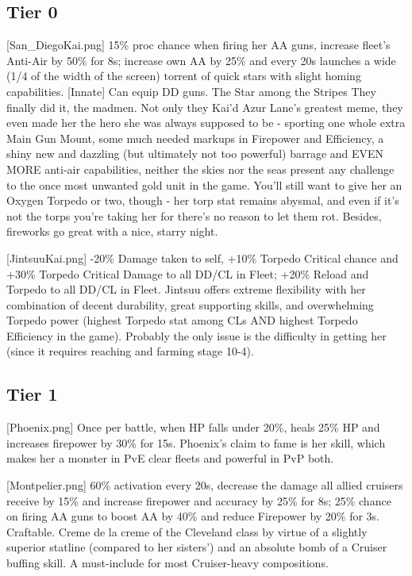 \subsection{Tier 0}
[San_DiegoKai.png]
{15\% proc chance when firing her AA guns, increase fleet's Anti-Air by 50\% for 8s; increase own AA by 25\% and every 20s launches a wide (1/4 of the width of the screen) torrent of quick stars with slight homing capabilities. [Innate] Can equip DD guns.}
{The Star among the Stripes}
{They finally did it, the madmen. Not only they Kai'd Azur Lane's greatest meme, they even made her the hero she was always supposed to be - sporting one whole extra Main Gun Mount, some much needed markups in Firepower and Efficiency, a shiny new and dazzling (but ultimately not too powerful) barrage and EVEN MORE anti-air capabilities, neither the skies nor the seas present any challenge to the once most unwanted gold unit in the game.
You'll still want to give her an Oxygen Torpedo or two, though - her torp stat remains abysmal, and even if it's not the torps you're taking her for there's no reason to let them rot. Besides, fireworks go great with a nice, starry night.}

[JintsuuKai.png]
{-20\% Damage taken to self, +10\% Torpedo Critical chance and +30\% Torpedo Critical Damage to all DD/CL in Fleet; +20\% Reload and Torpedo to all DD/CL in Fleet.}
{}
{Jintsuu offers extreme flexibility with her combination of decent durability, great supporting skills, and overwhelming Torpedo power (highest Torpedo stat among CLs AND highest Torpedo Efficiency in the game). Probably the only issue is the difficulty in getting her (since it requires reaching and farming stage 10-4).}
 
 
\newpage
\subsection{Tier 1}
[Phoenix.png]
{Once per battle, when HP falls under 20\%, heals 25\% HP and increases firepower by 30\% for 15s.}
{}
{Phoenix's claim to fame is her skill, which makes her a monster in PvE clear fleets and powerful in PvP both.}

[Montpelier.png]
{60\% activation every 20s, decrease the damage all allied cruisers receive by 15\% and increase firepower and accuracy by 25\% for 8s; 25\% chance on firing AA guns to boost AA by 40\% and reduce Firepower by 20\% for 3s.\\
Craftable.}
{}
{Creme de la creme of the Cleveland class by virtue of a slightly superior statline (compared to her sisters') and an absolute bomb of a Cruiser buffing skill. A must-include for most Cruiser-heavy compositions.}

